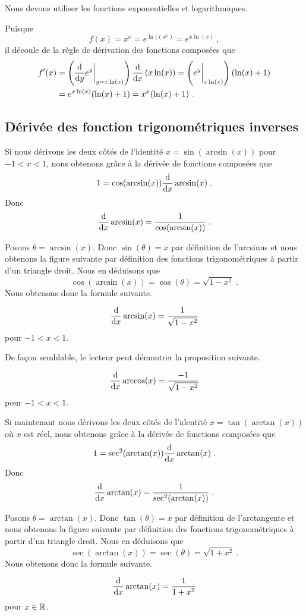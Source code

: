 {\begin{egg}
Nous devons utiliser les fonctions exponentielles et logarithmiques.

Puisque
\[
f(x) = x^x = e^{\ln((x^x)}  = e^{x\ln(x)} \ ,
\]
il découle de la règle de dérivation des fonctions composées que
\begin{align*}
f'(x) &= \left(\dfdx{e^y}{y} \bigg|_{y=x\ln(x)} \right)
\dfdx{\left( x\ln(x)\right)}{x}
= \left( e^y \bigg|_{x\ln(x)} \right) ( \ln(x) + 1 ) \\
&= e^{x\ln(x)} ( \ln(x) + 1)
= x^x( \ln(x) + 1) \ .
\end{align*}
\end{egg}

\subsection{Dérivée des fonction trigonométriques inverses \life \eng}

Si nous dérivons les deux côtés de l'identité $x = \sin (\arcsin(x))$ pour
$-1 < x < 1$, nous obtenons grâce à la dérivée de fonctions composées que
\[
1 = \cos(\arcsin(x)) \dfdx{\arcsin(x)}{x} \; .
\]
Donc
\[
\dfdx{\arcsin(x)}{x} = \frac{1}{\cos(\arcsin(x))} \; .
\]

Posons $\theta = \arcsin(x)$.  Donc $\sin(\theta) = x$ par définition
de l'arcsinus et nous obtenons la figure suivante par définition des
fonctions trigonométriques à partir d'un triangle droit.
Nous en déduisons que
\[
\cos(\arcsin(x)) = \cos(\theta) = \sqrt{1-x^2} \; .
\]
Nous obtenons donc la formule suivante.

\begin{prop}
\[
\dfdx{\arcsin(x)}{x} = \frac{1}{\sqrt{1-x^2}}
\]
pour $-1<x<1$.
\end{prop}

De façon semblable, le lecteur peut démontrer la proposition suivante.

\begin{prop}
\[
\dfdx{\arccos(x)}{x} = \frac{-1}{\sqrt{1-x^2}}
\]
pour $-1<x<1$.
\end{prop}

Si maintenant nous dérivons les deux côtés de l'identité
$x = \tan (\arctan(x))$
où $x$ est réel, nous obtenons grâce à la dérivée de fonctions composées que
\[
1 = \sec^2(\arctan(x)) \dfdx{\arctan(x)}{x}\; .
\]
Donc
\[
\dfdx{\arctan(x)}{x} = \frac{1}{\sec^2(\arctan(x))} \; .
\]

Posons $\theta = \arctan(x)$.  Donc $\tan(\theta) = x$ par définition
de l'arctangente et nous obtenons la figure suivante par définition des
fonctions trigonométriques à partir d'un triangle droit.
Nous en déduisons que
\[
\sec(\arctan(x)) = \sec(\theta) = \sqrt{1+x^2} \ .
\]
Nous obtenons donc la formule suivante.

\begin{prop}
\[
\dfdx{\arctan(x)}{x} = \frac{1}{1+x^2}
\]
pour $x\in \RR$.
\end{prop}

}  %

